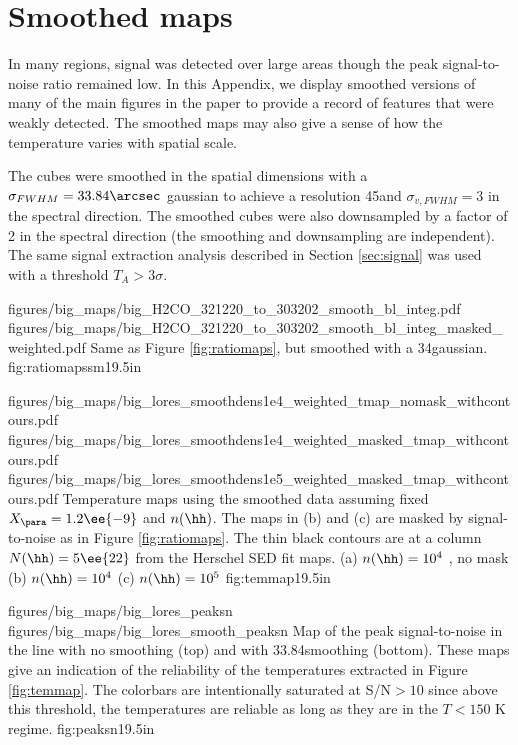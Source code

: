 \section{Smoothed maps}
In many regions, signal was detected over large areas though the peak
signal-to-noise ratio remained low.  In this Appendix, we display smoothed
versions of many of the main figures in the paper to provide a record of
features that were weakly detected.  The smoothed maps may also give a sense
of how the temperature varies with spatial scale.

The cubes were smoothed in the spatial dimensions with a
$\sigma_{FWHM}=33.84\arcsec$ gaussian to achieve a resolution 45\arcsec and
$\sigma_{v, FWHM} = 3$ \kms in the spectral direction.  The smoothed cubes were
also downsampled by a factor of 2 in the spectral direction (the smoothing and
downsampling are independent).  
The same signal extraction analysis described in Section \ref{sec:signal} was used with a
threshold $T_A > 3\sigma$.  


\RotFigureTwoAA
{figures/big_maps/big_H2CO_321220_to_303202_smooth_bl_integ.pdf}
{figures/big_maps/big_H2CO_321220_to_303202_smooth_bl_integ_masked_weighted.pdf}
{Same as Figure \ref{fig:ratiomaps}, but smoothed with a 34\arcsec gaussian.
}
{fig:ratiomapssm}{1}{9.5in}


\RotFigureThreeAA
{figures/big_maps/big_lores_smoothdens1e4_weighted_tmap_nomask_withcontours.pdf}
{figures/big_maps/big_lores_smoothdens1e4_weighted_masked_tmap_withcontours.pdf}
{figures/big_maps/big_lores_smoothdens1e5_weighted_masked_tmap_withcontours.pdf}
{Temperature maps using the smoothed data assuming fixed $X_{\para}=1.2\ee{-9}$
and $n(\hh)$.  The maps in (b) and (c) are masked by signal-to-noise as in Figure
\ref{fig:ratiomaps}.  The thin black contours are at a column $N(\hh)=5\ee{22}$
\percc from the Herschel SED fit maps.
(a) $n(\hh) = 10^4$ \percc, no mask
(b) $n(\hh) = 10^4$ \percc
(c) $n(\hh) = 10^5$ \percc
}
{fig:temmap}{1}{9.5in}


\RotFigureTwoAA
{figures/big_maps/big_lores_peaksn}
{figures/big_maps/big_lores_smooth_peaksn}
{Map of the peak signal-to-noise in the \para \threeohthree line with no
smoothing (top) and with 33.84\arcsec smoothing (bottom).  
These maps give an indication of the reliability of the temperatures extracted
in Figure \ref{fig:temmap}.  The colorbars are intentionally saturated at
S/N$>10$ since above this threshold, the temperatures are reliable as long as
they are in the $T<150$ K regime.
}
{fig:peaksn}{1}{9.5in}

